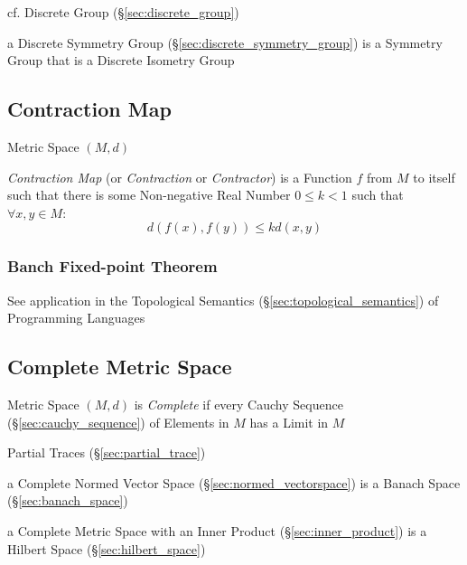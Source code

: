 cf. Discrete Group (\S\ref{sec:discrete_group})

a Discrete Symmetry Group (\S\ref{sec:discrete_symmetry_group}) is a Symmetry
Group that is a Discrete Isometry Group



\subsection{Contraction Map}\label{sec:contraction_map}

Metric Space $(M,d)$

\emph{Contraction Map} (or \emph{Contraction} or \emph{Contractor}) is
a Function $f$ from $M$ to itself such that there is some Non-negative
Real Number $0 \leq k < 1$ such that $\forall x,y \in M$:
\[
  d(f(x),f(y)) \leq k d(x,y)
\]



\subsubsection{Banch Fixed-point Theorem}\label{sec:banach_fixedpoint}

\fist See application in the Topological Semantics
(\S\ref{sec:topological_semantics}) of Programming Languages



\subsection{Complete Metric Space}\label{sec:complete_metric_space}

Metric Space $(M,d)$ is \emph{Complete} if every Cauchy Sequence
(\S\ref{sec:cauchy_sequence}) of Elements in $M$ has a Limit in $M$

Partial Traces (\S\ref{sec:partial_trace})

a Complete Normed Vector Space (\S\ref{sec:normed_vectorspace}) is a Banach
Space (\S\ref{sec:banach_space})

a Complete Metric Space with an Inner Product (\S\ref{sec:inner_product}) is a
Hilbert Space (\S\ref{sec:hilbert_space})



